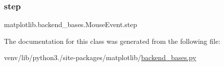 \subsubsection{\texorpdfstring{step}{step}}
{\footnotesize\ttfamily matplotlib.\+backend\+\_\+bases.\+Mouse\+Event.\+step}



The documentation for this class was generated from the following file\+:\begin{DoxyCompactItemize}
\item 
venv/lib/python3./site-\/packages/matplotlib/\hyperlink{backend__bases_8py}{backend\+\_\+bases.\+py}\end{DoxyCompactItemize}
